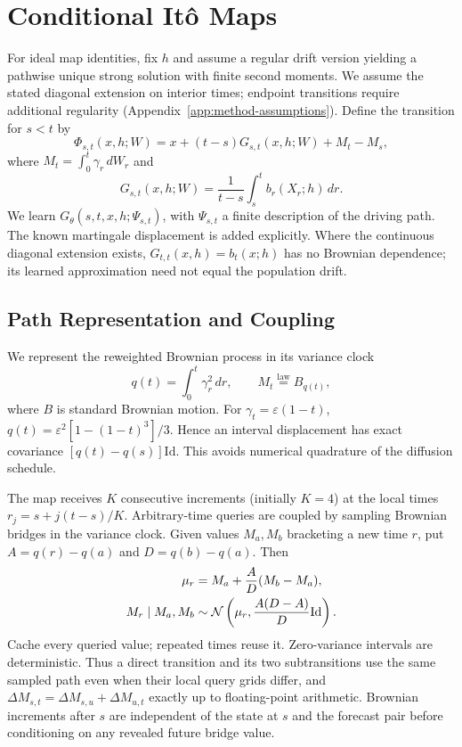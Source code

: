 \section{Conditional It\^o Maps}
For ideal map identities, fix $h$ and assume a regular drift version yielding a pathwise unique strong solution with finite second moments. We assume the stated diagonal extension on interior times; endpoint transitions require additional regularity (Appendix~\ref{app:method-assumptions}). Define the transition for $s<t$ by
\begin{equation}
 \Phi_{s,t}(x,h;W)
 =x+(t-s)G_{s,t}(x,h;W)+M_t-M_s,
 \label{eq:ito}
\end{equation}
where $M_t=\int_0^t\gamma_r\,dW_r$ and
\begin{equation}
 G_{s,t}(x,h;W)=\frac{1}{t-s}
 \int_s^t b_r(X_r;h)\,dr.
 \label{eq:average}
\end{equation}
We learn $G_\theta(s,t,x,h;\Psi_{s,t})$, with $\Psi_{s,t}$ a finite description of the driving path. The known martingale displacement is added explicitly. Where the continuous diagonal extension exists, $G_{t,t}(x,h)=b_t(x;h)$ has no Brownian dependence; its learned approximation need not equal the population drift.

\subsection{Path Representation and Coupling}\label{sec:map-path}
We represent the reweighted Brownian process in its variance clock
\begin{equation}
 q(t)=\int_0^t\gamma_r^2\,dr,
 \qquad M_t\overset{\mathrm{law}}=B_{q(t)},
\end{equation}
where $B$ is standard Brownian motion. For $\gamma_t=\varepsilon(1-t)$, $q(t)=\varepsilon^2[1-(1-t)^3]/3$. Hence an interval displacement has exact covariance $[q(t)-q(s)]\mathrm{Id}$. This avoids numerical quadrature of the diffusion schedule.

The map receives $K$ consecutive increments (initially $K=4$) at the local times $r_j=s+j(t-s)/K$. Arbitrary-time queries are coupled by sampling Brownian bridges in the variance clock. Given values $M_a,M_b$ bracketing a new time $r$, put $A=q(r)-q(a)$ and $D=q(b)-q(a)$. Then
\begin{align}
 \mu_r&=M_a+\frac{A}{D}(M_b-M_a),\nonumber\\
 M_r\mid M_a,M_b&\sim\mathcal{N}\left(\mu_r,
 \frac{A(D-A)}{D}\mathrm{Id}\right).
 \label{eq:bridge}
\end{align}
Cache every queried value; repeated times reuse it. Zero-variance intervals are deterministic. Thus a direct transition and its two subtransitions use the same sampled path even when their local query grids differ, and $\Delta M_{s,t}=\Delta M_{s,u}+\Delta M_{u,t}$ exactly up to floating-point arithmetic. Brownian increments after $s$ are independent of the state at $s$ and the forecast pair before conditioning on any revealed future bridge value.

